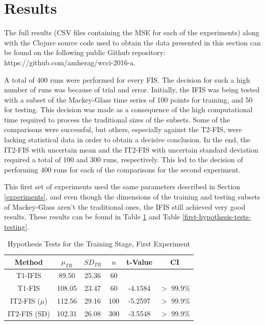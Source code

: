 \documentclass[conference]{IEEEtran}
\begin{document}
\section{Results}
\label{results}

The full results (CSV files containing the MSE for each of the
experiments) along with the Clojure source code used to obtain the
data presented in this section can be found on the following public
Github repository: https://github.com/amherag/wcci-2016-a.

A total of 400 runs were performed for every FIS. The decision for
such a high number of runs was because of trial and error. Initially,
the IFIS was being tested with a subset of the Mackey-Glass time
series of 100 points for training, and 50 for testing. This decision
was made as a consequence of the high computational time required to
process the traditional sizes of the subsets. Some of the
comparisons were successful, but others, especially against the
T2-FIS, were lacking statistical data in order to obtain a decisive
conclusion. In the end, the IT2-FIS with uncertain mean and the
IT2-FIS with uncertain standard deviation required a total of 100 and
300 runs, respectively. This led to the decision of performing 400
runs for each of the comparisons for the second experiment.

This first set of experiments used the same parameters
described in Section \ref{experiments}, and even though the dimensions
of the training and testing subsets of Mackey-Glass aren't the
traditional ones, the IFIS still achieved very good results. These
results can be found in Table \ref{first-hypothesis-tests-training}
and Table \ref{first-hypothesis-tests-testing}.

\begin{table}[!t]
  \renewcommand{\arraystretch}{1.3}
  \caption{Hypothesis Tests for the Training Stage, First Experiment}
  \label{first-hypothesis-tests-training}
  \centering
  \begin{tabular}{|c|c|c|c|c|c|}
    \hline
    Method & $\mu_{TR}$ & $SD_{TR}$ & $n$ & t-Value & CI \\
    \hline
    T1-IFIS & 89.50 & 25.36 & 60 &  & \\
    \hline
    T1-FIS & 108.05 & 23.47 & 60 & -4.1584 & $>$ 99.9\% \\
    \hline
    IT2-FIS (\(\mu\)) & 112.56 & 29.16 & 100 & -5.2597 & $>$ 99.9\% \\
    \hline
    IT2-FIS (SD) & 102.31 & 26.08 & 300 & -3.5548 & $>$ 99.9\% \\
    \hline
  \end{tabular}
\end{table}
\end{document}
